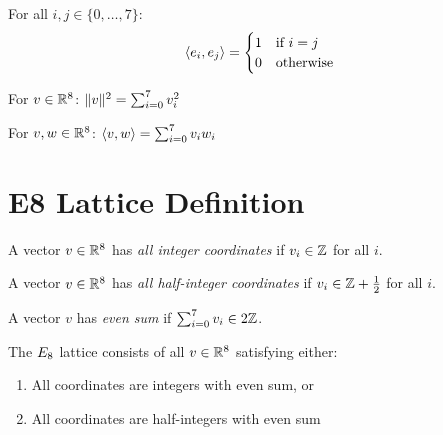 \begin{theorem}\label{thm:stdBasis_orthonormal}
    \leanok
    For all $i, j \in \{0, \ldots, 7\}$:
    \[
        \langle e_i, e_j \rangle = \begin{cases} 1 & \text{if } i = j \\ 0 & \text{otherwise} \end{cases}
    \]
\end{theorem}

\begin{theorem}\label{thm:normSq_eq_sum}
    \leanok
    For $v \in \mathbb{R}^8$: $\| v \|^2 = \sum_{i=0}^{7} v_i^2$
\end{theorem}

\begin{theorem}\label{thm:inner_eq_sum}
    \leanok
    For $v, w \in \mathbb{R}^8$: $\langle v, w \rangle = \sum_{i=0}^{7} v_i w_i$
\end{theorem}

\section{E8 Lattice Definition}

\begin{definition}\label{def:AllInteger}
    \leanok
    A vector $v \in \mathbb{R}^8$ has \emph{all integer coordinates} if $v_i \in \mathbb{Z}$ for all $i$.
\end{definition}

\begin{definition}\label{def:AllHalfInteger}
    \leanok
    A vector $v \in \mathbb{R}^8$ has \emph{all half-integer coordinates} if
    $v_i \in \mathbb{Z} + \frac{1}{2}$ for all $i$.
\end{definition}

\begin{definition}\label{def:SumEven}
    \leanok
    A vector $v$ has \emph{even sum} if $\sum_{i=0}^{7} v_i \in 2\mathbb{Z}$.
\end{definition}

\begin{definition}[E8 Lattice]\label{def:E8_lattice}
    \leanok
    The $E_8$ lattice consists of all $v \in \mathbb{R}^8$ satisfying either:
    \begin{enumerate}
        \item All coordinates are integers with even sum, or
        \item All coordinates are half-integers with even sum
    \end{enumerate}
\end{definition}

